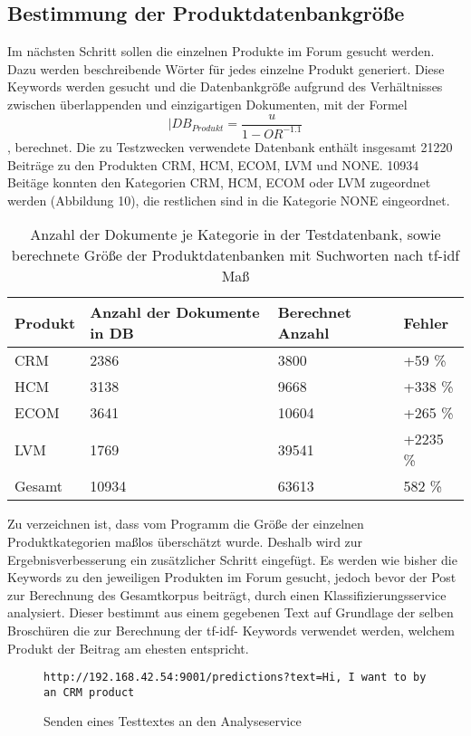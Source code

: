 \subsection{Bestimmung der Produktdatenbankgröße}

Im nächsten Schritt sollen die einzelnen Produkte im Forum gesucht werden. Dazu werden beschreibende Wörter für jedes einzelne Produkt generiert. Diese Keywords werden gesucht und die Datenbankgröße aufgrund des Verhältnisses zwischen überlappenden und einzigartigen Dokumenten, mit der Formel  \[|DB_{Produkt} = \frac{u}{1-OR^{-1.1}}\] \cite{lu2008efficient}, berechnet. Die zu Testzwecken verwendete Datenbank enthält insgesamt 21220 Beiträge zu den Produkten CRM, HCM, ECOM, LVM und NONE. 10934 Beitäge konnten den Kategorien CRM, HCM, ECOM oder LVM zugeordnet werden (Abbildung 10), die restlichen sind in die Kategorie NONE eingeordnet.

\begin{table}[h!]
\centering 
\begin{tabular}{ | p{3cm} | l | | l | | l |}
\hline
Produkt & Anzahl der Dokumente in DB & Berechnet Anzahl & Fehler\\ \hline
CRM & 2386 & 3800 & +59 \%\\ \hline
HCM & 3138 & 9668 & +338 \%\\ \hline
ECOM & 3641 & 10604 & +265 \%\\ \hline
LVM & 1769 & 39541 & +2235 \%\\ \hline
Gesamt & 10934 & 63613 & 582 \% \\ \hline
\end{tabular}
\caption{Anzahl der Dokumente je Kategorie in der Testdatenbank, sowie berechnete Größe der Produktdatenbanken mit Suchworten nach tf-idf Maß}
\end{table}

Zu verzeichnen ist, dass vom Programm die Größe der einzelnen Produktkategorien maßlos überschätzt wurde. Deshalb wird zur Ergebnisverbesserung ein zusätzlicher Schritt eingefügt. Es werden wie bisher die Keywords zu den jeweiligen Produkten im Forum gesucht, jedoch bevor der Post zur Berechnung des Gesamtkorpus beiträgt, durch einen Klassifizierungsservice \cite{n2o} analysiert. Dieser bestimmt aus einem gegebenen Text auf Grundlage der selben Broschüren die zur Berechnung der tf-idf- Keywords verwendet werden, welchem Produkt der Beitrag am ehesten entspricht.

\begin{figure}[h!]
\begin{lstlisting}[language=HTML5]
http://192.168.42.54:9001/predictions?text=Hi, I want to by an CRM product
\end{lstlisting}
\caption{Senden eines Testtextes an den Analyseservice}
\end{figure}

